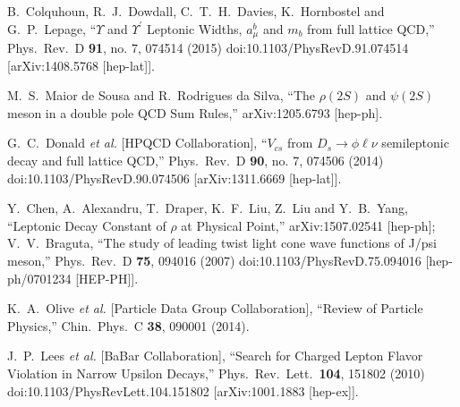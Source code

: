 \documentclass[12pt]{article}
\begin{document}
\begin{thebibliography}{99}
  B.~Colquhoun, R.~J.~Dowdall, C.~T.~H.~Davies, K.~Hornbostel and G.~P.~Lepage,
  ``$\Upsilon$ and $\Upsilon^{\prime}$ Leptonic Widths, $a_{\mu}^b$ and $m_b$ from full lattice QCD,''
  Phys.\ Rev.\ D {\bf 91}, no. 7, 074514 (2015)
  doi:10.1103/PhysRevD.91.074514
  [arXiv:1408.5768 [hep-lat]].

  M.~S.~Maior de Sousa and R.~Rodrigues da Silva,
  ``The $\rho(2S)$ and $\psi(2S)$ meson in a double pole QCD Sum Rules,''
  arXiv:1205.6793 [hep-ph].

  G.~C.~Donald {\it et al.} [HPQCD Collaboration],
  ``$V_{cs}$ from $D_s \to \phi \ell \nu$ semileptonic decay and full lattice QCD,''
  Phys.\ Rev.\ D {\bf 90}, no. 7, 074506 (2014)
  doi:10.1103/PhysRevD.90.074506
  [arXiv:1311.6669 [hep-lat]].

  Y.~Chen, A.~Alexandru, T.~Draper, K.~F.~Liu, Z.~Liu and Y.~B.~Yang,
  ``Leptonic Decay Constant of $\rho$ at Physical Point,''
  arXiv:1507.02541 [hep-ph];
   V.~V.~Braguta,
  ``The study of leading twist light cone wave functions of J/psi meson,''
  Phys.\ Rev.\ D {\bf 75}, 094016 (2007)
  doi:10.1103/PhysRevD.75.094016
  [hep-ph/0701234 [HEP-PH]].

  K.~A.~Olive {\it et al.}  [Particle Data Group Collaboration],
  ``Review of Particle Physics,''
  Chin.\ Phys.\ C {\bf 38}, 090001 (2014).

  J.~P.~Lees {\it et al.} [BaBar Collaboration],
  ``Search for Charged Lepton Flavor Violation in Narrow Upsilon Decays,''
  Phys.\ Rev.\ Lett.\  {\bf 104}, 151802 (2010)
  doi:10.1103/PhysRevLett.104.151802
  [arXiv:1001.1883 [hep-ex]].


\end{thebibliography}
\end{document}
